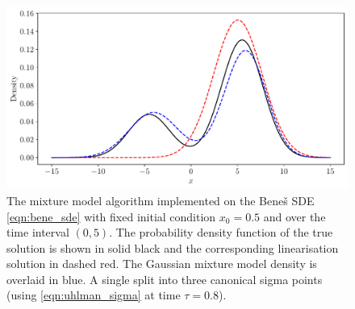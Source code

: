 \begin{figure}
	\centering
	\includegraphics[width=\textwidth]{chp05_gmm/figures/bene_final_gmm}
	\caption{The mixture model algorithm implemented on the Bene\v{s} SDE \cref{eqn:bene_sde} with fixed initial condition \(x_0 = 0.5\) and over the time interval \((0,5)\).
		The probability density function of the true solution is shown in solid black and the corresponding linearisation solution in dashed red.
		The Gaussian mixture model density is overlaid in blue.
		A single split into three canonical sigma points (using \cref{eqn:uhlman_sigma} at time \(\tau = 0.8\)).}
	\label{fig:bene_gmm}
\end{figure}

